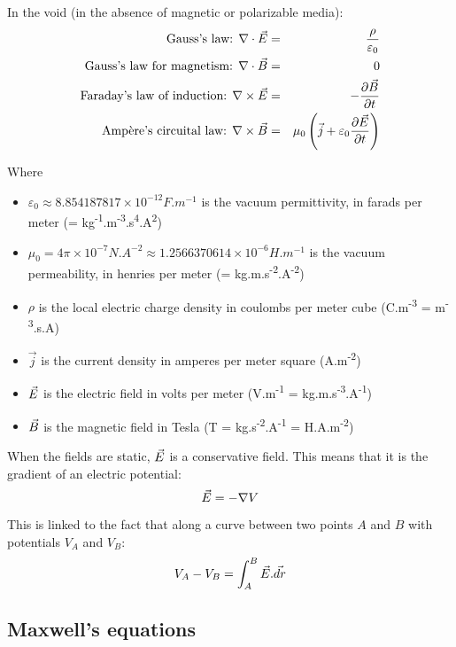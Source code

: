 \documentclass[a4paper,10pt]{article}
\newcommand{\vE}{\ensuremath\vec{E}} %
\newcommand{\vB}{\ensuremath\vec{B}} %
\newcommand{\pderiv}[2]{\ensuremath\frac{\partial #2}{\partial #1}}
\newcommand{\pdt}[1]{\ensuremath\pderiv{t}{#1}}
\begin{document}
In the void (in the absence of magnetic or polarizable media):
\begin{eqnarray}
  \text{Gauss's law: } \nabla \cdot \vE &=& \frac {\rho} {\varepsilon_0} \\
  \text{Gauss's law for magnetism: } \nabla \cdot \vB &=& 0 \\
  \text{Faraday's law of induction: } \nabla \times \vE &=& -\pdt{\vB} \\
  \text{Ampère's circuital law: } \nabla \times \vB &=& \mu_0\left(\vec{j} + \varepsilon_0 \pdt{\vE}\right)
\end{eqnarray}

Where
\begin{itemize}
  \item $\varepsilon_0 \approx 8.854187817 \times 10^{-12} F.m^{-1}$ is the vacuum permittivity, in farads per meter (= kg\textsuperscript{-1}.m\textsuperscript{-3}.s\textsuperscript{4}.A\textsuperscript{2})
  \item $\mu_0 = 4\pi \times 10^{-7} N.A^{-2} \approx 1.2566370614 \times 10^{-6} H.m^{-1}$ is the vacuum permeability, in henries per meter (= kg.m.s\textsuperscript{-2}.A\textsuperscript{-2})
  \item $\rho$ is the local electric charge density in coulombs per meter cube (C.m\textsuperscript{-3} = m\textsuperscript{-3}.s.A)
  \item $\vec{j}$ is the current density in amperes per meter square (A.m\textsuperscript{-2})
  \item $\vE$ is the electric field in volts per meter (V.m\textsuperscript{-1} = kg.m.s\textsuperscript{-3}.A\textsuperscript{-1})
  \item $\vB$ is the magnetic field in Tesla (T = kg.s\textsuperscript{-2}.A\textsuperscript{-1} = H.A.m\textsuperscript{-2})
\end{itemize}

When the fields are static, $\vE$ is a conservative field. This means that it is the gradient of an electric potential:
\begin{equation}
  \vE = -\nabla V
\end{equation}

This is linked to the fact that along a curve between two points $A$ and $B$ with potentials $V_A$ and $V_B$:
\begin{equation}
  V_A - V_B = \int_A^B \vE.\vec{dr}
\end{equation}

\subsection{Maxwell's equations}
\end{document}
